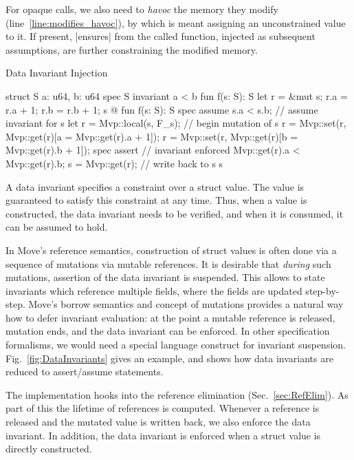 For opaque calls, we also need to \emph{havoc} the memory they modify
(line~\ref{line:modifies_havoc}), by which is meant assigning an unconstrained
value to it. If present, |ensures| from the called function, injected as
subsequent assumptions, are further constraining the modified memory.



\begin{Figure}
  \caption{Data Invariant Injection}
  \label{fig:DataInvariants}
  \centering
\begin{MoveBox}
  struct S { a: u64, b: u64 }
  spec S { invariant a < b }
  fun f(s: S): S {
    let r = &mut s;
    r.a = r.a + 1;
    r.b = r.b + 1;
    s
  }
  @\transform@
  fun f(s: S): S {
    spec assume s.a < s.b;      // assume invariant for s
    let r = Mvp::local(s, F_s); // begin mutation of s
    r = Mvp::set(r, Mvp::get(r)[a = Mvp::get(r).a + 1]);
    r = Mvp::set(r, Mvp::get(r)[b = Mvp::get(r).b + 1]);
    spec assert                 // invariant enforced
      Mvp::get(r).a < Mvp::get(r).b;
    s = Mvp::get(r);            // write back to s
    s
  }
\end{MoveBox}
\end{Figure}

A data invariant specifies a constraint over a struct value. The value is
guaranteed to satisfy this constraint at any time. Thus, when a value is
constructed, the data invariant needs to be verified, and when it is consumed,
it can be assumed to hold.

In Move's reference semantics, construction of struct values is often done via a
sequence of mutations via mutable references. It is desirable that \emph{during}
such mutations, assertion of the data invariant is suspended. This allows to
state invariants which reference multiple fields, where the fields are updated
step-by-step.  Move's borrow semantics and concept of mutations provides a
natural way how to defer invariant evaluation: at the point a mutable reference
is released, mutation ends, and the data invariant can be enforced.  In other
specification formalisms, we would need a special language construct for
invariant suspension. Fig.~\ref{fig:DataInvariants} gives an example, and shows
how data invariants are reduced to assert/assume statements.


The implementation hooks into the reference elimination
(Sec.~\ref{sec:RefElim}). As part of this the lifetime of references is
computed. Whenever a reference is released and the mutated value is written
back, we also enforce the data invariant. In addition, the data invariant is
enforced when a struct value is directly constructed.




